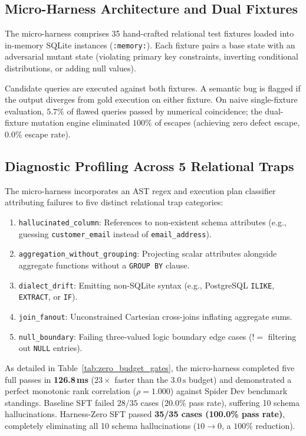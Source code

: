 \documentclass{article}
\theoremstyle{plain}
\theoremstyle{definition}
\theoremstyle{remark}
\begin{document}
\subsection{Micro-Harness Architecture and Dual Fixtures}
The micro-harness comprises 35 hand-crafted relational test fixtures loaded into in-memory SQLite instances (\texttt{:memory:}). Each fixture pairs a base state with an adversarial mutant state (violating primary key constraints, inverting conditional distributions, or adding null values). 

Candidate queries are executed against both fixtures. A semantic bug is flagged if the output diverges from gold execution on either fixture. On naive single-fixture evaluation, $5.7\%$ of flawed queries passed by numerical coincidence; the dual-fixture mutation engine eliminated $100\%$ of escapes (achieving zero defect escape, $0.0\%$ escape rate).

\subsection{Diagnostic Profiling Across 5 Relational Traps}
The micro-harness incorporates an AST regex and execution plan classifier attributing failures to five distinct relational trap categories:
\begin{enumerate}[leftmargin=*,itemsep=1pt]
    \item \texttt{hallucinated\_column}: References to non-existent schema attributes (e.g., guessing \texttt{customer\_email} instead of \texttt{email\_address}).
    \item \texttt{aggregation\_without\_grouping}: Projecting scalar attributes alongside aggregate functions without a \texttt{GROUP BY} clause.
    \item \texttt{dialect\_drift}: Emitting non-SQLite syntax (e.g., PostgreSQL \texttt{ILIKE}, \texttt{EXTRACT}, or \texttt{IF}).
    \item \texttt{join\_fanout}: Unconstrained Cartesian cross-joins inflating aggregate sums.
    \item \texttt{null\_boundary}: Failing three-valued logic boundary edge cases ($!=$ filtering out \texttt{NULL} entries).
\end{enumerate}

As detailed in Table~\ref{tab:zero_budget_gates}, the micro-harness completed five full passes in \textbf{126.8\,ms} ($23\times$ faster than the $3.0\,\text{s}$ budget) and demonstrated a perfect monotonic rank correlation ($\rho = 1.000$) against Spider Dev benchmark standings. Baseline SFT failed $28/35$ cases ($20.0\%$ pass rate), suffering 10 schema hallucinations. Harness-Zero SFT passed \textbf{35/35 cases (100.0\% pass rate)}, completely eliminating all 10 schema hallucinations ($10 \to 0$, a $100\%$ reduction).
\end{document}
